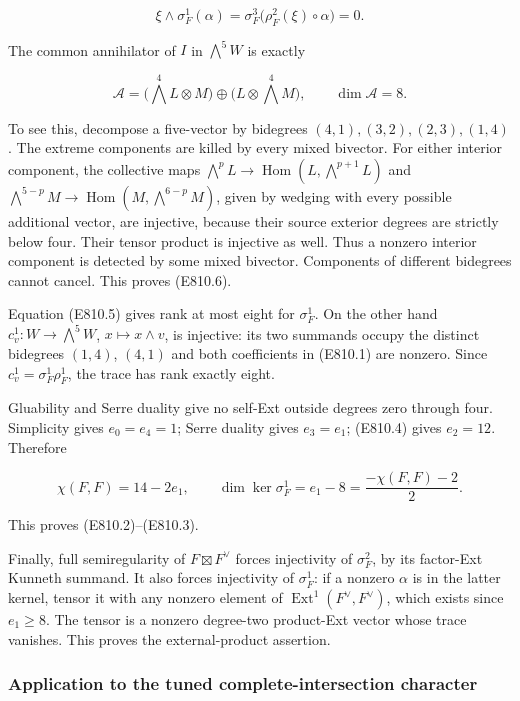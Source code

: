 \[
 \xi\wedge\sigma_F^1(\alpha)
   =\sigma_F^3\bigl(\rho_F^2(\xi)\circ\alpha\bigr)=0.
 \tag{E810.5}
\]

The common annihilator of \(I\) in \(\bigwedge^5W\) is exactly

\[
 \mathcal A=
 \bigl(\bigwedge^4L\otimes M\bigr)
 \oplus\bigl(L\otimes\bigwedge^4M\bigr),\qquad\dim\mathcal A=8.
 \tag{E810.6}
\]

To see this, decompose a five-vector by bidegrees
\((4,1),(3,2),(2,3),(1,4)\). The extreme components are killed by every
mixed bivector. For either interior component, the collective maps
\(\bigwedge^p L\to\operatorname{Hom}(L,\bigwedge^{p+1}L)\) and
\(\bigwedge^{5-p}M\to\operatorname{Hom}(M,\bigwedge^{6-p}M)\), given by
wedging with every possible additional vector, are injective, because
their source exterior degrees are strictly below four. Their tensor
product is injective as well. Thus a nonzero interior component is
detected by some mixed bivector. Components of different bidegrees
cannot cancel. This proves (E810.6).

Equation (E810.5) gives rank at most eight for \(\sigma_F^1\). On the
other hand \(c_v^1:W\to\bigwedge^5W\), \(x\mapsto x\wedge v\), is
injective: its two summands occupy the distinct bidegrees \((1,4)\),
\((4,1)\) and both coefficients in (E810.1) are nonzero. Since
\(c_v^1=\sigma_F^1\rho_F^1\), the trace has rank exactly eight.

Gluability and Serre duality give no self-Ext outside degrees zero
through four. Simplicity gives \(e_0=e_4=1\); Serre duality gives
\(e_3=e_1\); (E810.4) gives \(e_2=12\). Therefore

\[
 \chi(F,F)=14-2e_1,
 \qquad\dim\ker\sigma_F^1=e_1-8=\frac{-\chi(F,F)-2}{2}.
\]

This proves (E810.2)--(E810.3).

Finally, full semiregularity of \(F\boxtimes F^\vee\) forces injectivity
of \(\sigma_F^2\), by its factor-Ext Kunneth summand. It also forces
injectivity of \(\sigma_F^1\): if a nonzero \(\alpha\) is in the latter
kernel, tensor it with any nonzero element of
\(\operatorname{Ext}^1(F^\vee,F^\vee)\), which exists since \(e_1\ge8\).
The tensor is a nonzero degree-two product-Ext vector whose trace
vanishes. This proves the external-product assertion.

\subsubsection{Application to the tuned complete-intersection
character}\label{application-to-the-tuned-complete-intersection-character}

